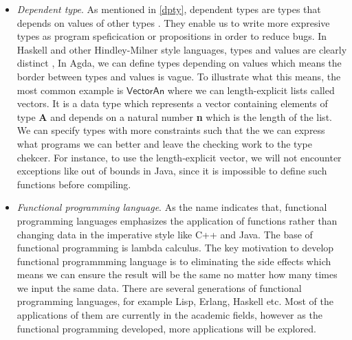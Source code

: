 \begin{itemize}
\item \textit{Dependent type}. 
As mentioned in \ref{dpty}, dependent types are types that depends on values of other types \cite{dtw}. They enable us to write more expresive types as program speficication or propositions in order to reduce bugs. In Haskell and other Hindley-Milner style languages, types and values are clearly distinct \cite{tutorial}, In Agda, we can define types depending on values which means the border between types and values is vague. To illustrate what this means, the most common example is $\mathsf{Vector A n}$ where we can length-explicit lists called vectors. It is a data type which represents a vector containing elements of type \textbf{A} and depends on a natural number \textbf{n} which is the length of the list. We can specify types with more constraints such that the we can express what programs we can better and leave the checking work to the type chekcer. For instance, to use the length-explicit vector, we will not encounter exceptions like out of bounds in Java, since it is impossible to define such functions before compiling.

\item \textit{Functional programming language}. As the name indicates that, functional programming languages emphasizes the application of functions rather than changing data in the imperative style like C++ and Java. The base of functional programming is lambda calculus. The key motivation to develop functional programmming language is to eliminating the side effects which means we can ensure the result will be the same no matter how many times we input the same data. There are several generations of functional programming languages, for example Lisp, Erlang, Haskell etc. Most of the applications of them are currently in the academic fields, however as the functional programming developed, more applications will be explored.



\end{itemize}
